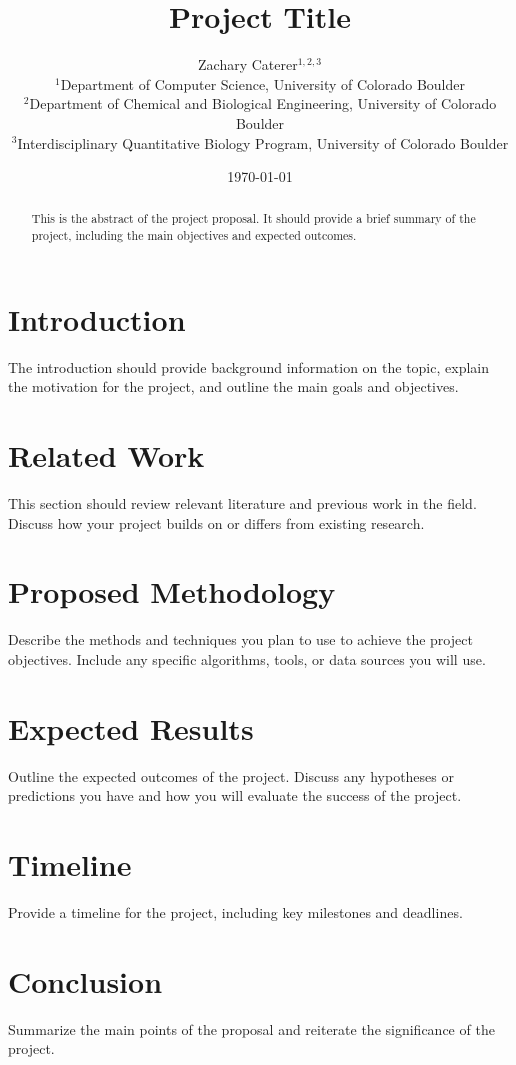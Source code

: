\documentclass[10pt,twocolumn]{article}
\title{\textbf{Project Title}}
\author{
    Zachary Caterer$^{1,2,3}$ \\
    \small $^1$Department of Computer Science, University of Colorado Boulder \\
    \small $^2$Department of Chemical and Biological Engineering, University of Colorado Boulder \\
    \small $^3$Interdisciplinary Quantitative Biology Program, University of Colorado Boulder
}
\date{\today}
\begin{document}
\maketitle

\begin{abstract}
This is the abstract of the project proposal. It should provide a brief summary of the project, including the main objectives and expected outcomes.
\end{abstract}

\section{Introduction}
The introduction should provide background information on the topic, explain the motivation for the project, and outline the main goals and objectives.

\section{Related Work}
This section should review relevant literature and previous work in the field. Discuss how your project builds on or differs from existing research.

\section{Proposed Methodology}
Describe the methods and techniques you plan to use to achieve the project objectives. Include any specific algorithms, tools, or data sources you will use.

\section{Expected Results}
Outline the expected outcomes of the project. Discuss any hypotheses or predictions you have and how you will evaluate the success of the project.

\section{Timeline}
Provide a timeline for the project, including key milestones and deadlines.

\section{Conclusion}
Summarize the main points of the proposal and reiterate the significance of the project.



\end{document}
